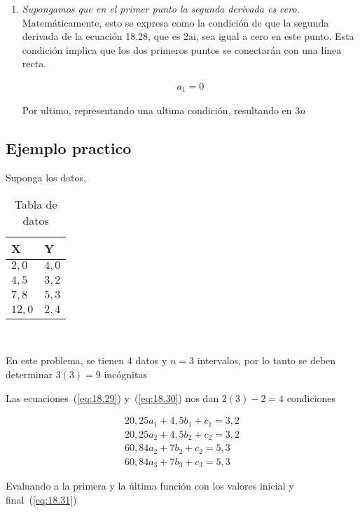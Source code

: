 \documentclass[conference]{IEEEtran}
\begin{document}
\begin{enumerate}
	\item \textit{Supongamos que en el primer punto la segunda derivada es cero.}
	      Matemáticamente, esto se expresa como la condición de que la segunda
	      derivada de la ecuación 18.28, que es 2ai, sea igual a cero en este punto.
	      Esta condición implica que los dos primeros puntos se conectarán
	      con una línea recta.

	      \begin{align}
		      a_{1} = 0
		      \label{eq:18.34}
	      \end{align}

	      Por ultimo, representando una ultima condición, resultando
	      en $3n$
\end{enumerate}

\subsection*{Ejemplo practico}

Suponga los datos,

\begin{table}[H]
	\begin{tabularx}{\linewidth}{|>{\centering\arraybackslash}X|>{\centering\arraybackslash}X|}
		\hline
		\textbf{X} & \textbf{Y} \\ \hline
		$2,0$      & $4,0$      \\ \hline
		$4,5$      & $3,2$      \\ \hline
		$7,8$      & $5,3$      \\ \hline
		$12,0$     & $2,4$      \\ \hline
	\end{tabularx}
	\label{tab:ejemplo_trazadores_cudraticos}~\caption{Tabla de datos}
\end{table}

En este problema, se tienen 4 datos y $n = 3$ intervalos, por lo tanto
se deben determinar $3(3) = 9$ incógnitas

Las ecuaciones~(\ref{eq:18.29}) y~(\ref{eq:18.30}) nos dan $2(3) - 2 = 4$
condiciones

\begin{align*}
	20,25a_{1} + 4,5b_{1} + c_{1} = 3,2 \\
	20,25a_{2} + 4,5b_{2} + c_{2} = 3,2 \\
	60,84a_{2} + 7b_{2} + c_{2} = 5,3   \\
	60,84a_{3} + 7b_{3} + c_{3} = 5,3
\end{align*}

Evaluando a la primera y la última función con los valores inicial y
final~(\ref{eq:18.31})
\end{document}
